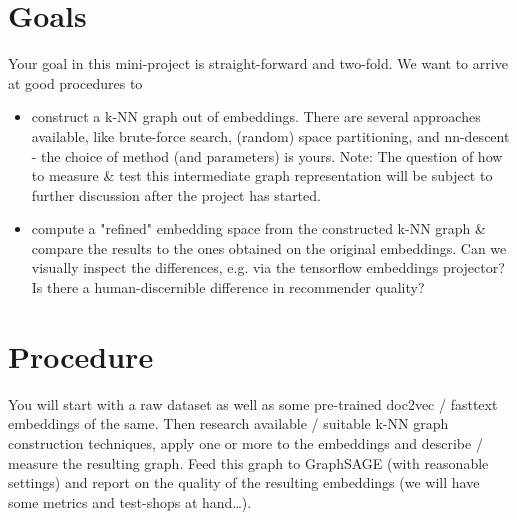 \documentclass[review]{elsarticle}
\begin{document}
\section{Goals}
\label{sect:goals}

Your goal in this mini-project is straight-forward and two-fold. We want to arrive at good procedures to

\begin{itemize}
  \item construct a k-NN graph out of embeddings. There are several approaches available, like brute-force search, (random) space partitioning, and nn-descent - the choice of method (and parameters) is yours. Note: The question of how to measure \& test this intermediate graph representation will be subject to further discussion after the project has started.
  \item compute a "refined" embedding space from the constructed k-NN graph \& compare the results to the ones obtained on the original embeddings. Can we visually inspect the differences, e.g. via the tensorflow embeddings projector? Is there a human-discernible difference in recommender quality?
\end{itemize}


\section{Procedure}
\label{sect:procedure}

You will start with a raw dataset as well as some pre-trained doc2vec / fasttext embeddings of the same. Then research available / suitable k-NN graph construction techniques, apply one or more to the embeddings and describe / measure the resulting graph. Feed this graph to GraphSAGE (with reasonable settings) and report on the quality of the resulting embeddings (we will have some metrics and test-shops at hand\dots).


\end{document}
